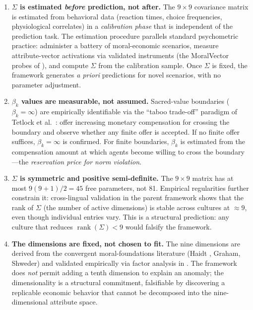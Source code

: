 \documentclass[12pt]{article}
\theoremstyle{definition}
\theoremstyle{remark}
\begin{document}
\begin{enumerate}
    \item \textbf{$\Sigma$ is estimated \emph{before} prediction, not after.}  The $9 \times 9$ covariance matrix is estimated from behavioral data (reaction times, choice frequencies, physiological correlates) in a \emph{calibration phase} that is independent of the prediction task.  The estimation procedure parallels standard psychometric practice: administer a battery of moral-economic scenarios, measure attribute-vector activations via validated instruments (the MoralVector probes of \cite{bond2026geometric}), and compute $\Sigma$ from the calibration sample.  Once $\Sigma$ is fixed, the framework generates \emph{a priori} predictions for novel scenarios, with no parameter adjustment.

    \item \textbf{$\beta_k$ values are measurable, not assumed.}  Sacred-value boundaries ($\beta_k = \infty$) are empirically identifiable via the ``taboo trade-off'' paradigm of Tetlock et al.\ \cite{tetlock2000}: offer increasing monetary compensation for crossing the boundary and observe whether any finite offer is accepted.  If no finite offer suffices, $\beta_k = \infty$ is confirmed.  For finite boundaries, $\beta_k$ is estimated from the compensation amount at which agents become willing to cross the boundary---the \emph{reservation price for norm violation}.

    \item \textbf{$\Sigma$ is symmetric and positive semi-definite.}  The $9 \times 9$ matrix has at most $9(9+1)/2 = 45$ free parameters, not 81.  Empirical regularities further constrain it: cross-lingual validation in the parent framework \cite{bond2026geometric} shows that the rank of $\Sigma$ (the number of active dimensions) is stable across cultures at $\approx 9$, even though individual entries vary.  This is a structural prediction: any culture that reduces $\operatorname{rank}(\Sigma) < 9$ would falsify the framework.

    \item \textbf{The dimensions are fixed, not chosen to fit.}  The nine dimensions are derived from the convergent moral-foundations literature (Haidt \cite{haidt2012}, Graham, Shweder) and validated empirically via factor analysis in \cite{bond2026geometric}.  The framework does \emph{not} permit adding a tenth dimension to explain an anomaly; the dimensionality is a structural commitment, falsifiable by discovering a replicable economic behavior that cannot be decomposed into the nine-dimensional attribute space.
\end{enumerate}
\end{document}
